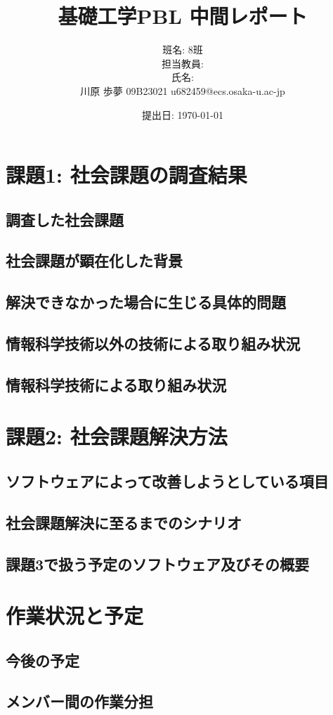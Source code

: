 \documentclass[a4j, titlepage]{jarticle}
\title{基礎工学PBL 中間レポート}
\author{班名: 8班\\担当教員: \\氏名: \\ 川原 歩夢 09B23021 u682459@ecs.osaka-u.ac-jp}
\date{提出日: \today}
\begin{document}
\maketitle

\section{課題1: 社会課題の調査結果}
\subsection{調査した社会課題}

\subsection{社会課題が顕在化した背景}

\subsection{解決できなかった場合に生じる具体的問題}

\subsection{情報科学技術以外の技術による取り組み状況}

\subsection{情報科学技術による取り組み状況}

\section{課題2: 社会課題解決方法}
\subsection{ソフトウェアによって改善しようとしている項目}

\subsection{社会課題解決に至るまでのシナリオ}

\subsection{課題3で扱う予定のソフトウェア及びその概要}

\section{作業状況と予定}
\subsection{今後の予定}

\subsection{メンバー間の作業分担}
\end{document}
